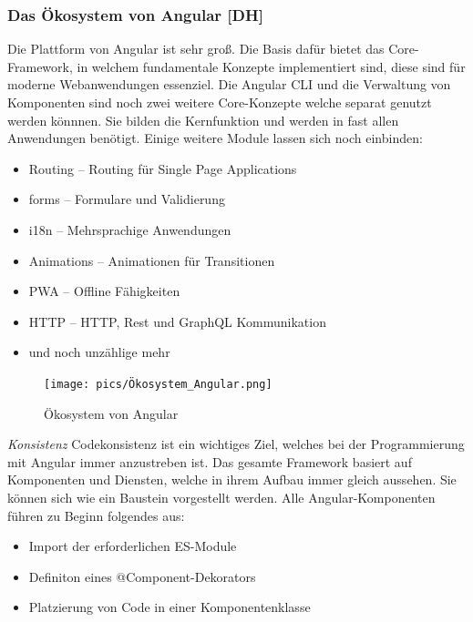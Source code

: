\subsubsection{Das Ökosystem von Angular [DH]}
Die Plattform von Angular ist sehr groß. Die Basis dafür bietet das Core-Framework, in welchem fundamentale Konzepte implementiert sind, diese sind für moderne Webanwendungen essenziel. Die Angular CLI und die Verwaltung von Komponenten sind noch zwei weitere Core-Konzepte welche separat genutzt werden könnnen. Sie bilden die Kernfunktion und werden in fast allen Anwendungen benötigt. Einige weitere Module lassen sich noch einbinden:

\begin{itemize}
  \item Routing – Routing für Single Page Applications
  \item forms – Formulare und Validierung
  \item i18n – Mehrsprachige Anwendungen
  \item Animations – Animationen für Transitionen
  \item PWA – Offline Fähigkeiten
  \item HTTP – HTTP, Rest und GraphQL Kommunikation
  \item und noch unzählige mehr  
\end{itemize}
\cite{AngularBeschreibung}

\begin{figure}[H]
  \centering
  \texttt{[image: pics/Ökosystem\_Angular.png]}
  \caption{Ökosystem von Angular}
  \cite{OekosystemAngularBild}
\end{figure}

\textit{Konsistenz}
Codekonsistenz ist ein wichtiges Ziel, welches bei der Programmierung mit Angular immer anzustreben ist. Das gesamte Framework basiert auf Komponenten und Diensten, welche in ihrem Aufbau immer gleich aussehen. Sie können sich wie ein Baustein vorgestellt werden. Alle Angular-Komponenten führen zu Beginn folgendes aus:

\begin{itemize}
  \item Import der erforderlichen ES-Module
  \item Definiton eines @Component-Dekorators
  \item Platzierung von Code in einer Komponentenklasse
\end{itemize}	

